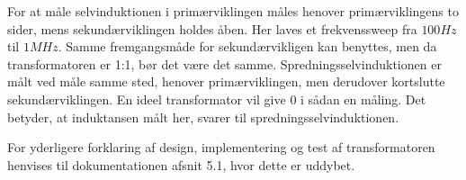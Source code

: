 For at måle selvinduktionen i primærviklingen måles henover primærviklingens to sider, mens sekundærviklingen holdes åben. Her laves et frekvenssweep fra $100Hz$ til $1MHz$. Samme fremgangsmåde for sekundærvikligen kan benyttes, men da transformatoren er 1:1, bør det være det samme.
Spredningsselvinduktionen er målt ved måle samme sted, henover primærviklingen, men derudover kortslutte sekundærviklingen. En ideel transformator vil give 0 i sådan en måling. Det betyder, at induktansen målt her, svarer til spredningsselvinduktionen. 

For yderligere forklaring af design, implementering og test af transformatoren henvises til dokumentationen afsnit 5.1, hvor dette er uddybet.